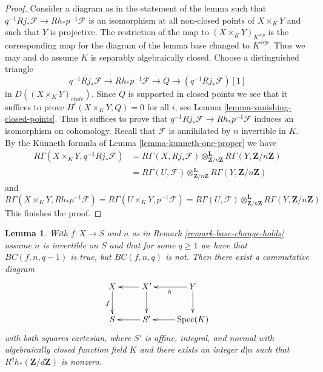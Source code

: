 \documentclass{amsart}
\theoremstyle{plain}
\newtheorem{lemma}[subsection]{Lemma}
\theoremstyle{definition}
\theoremstyle{remark}
\numberwithin{equation}{subsection}
\def\Spec{\mathop{\mathrm{Spec}}}
\def\etale{{\acute{e}tale}}
\begin{document}
\begin{proof}
\medskip\noindent
Consider a diagram as in the statement of the lemma
such that $q^{-1}Rj_*\mathcal{F} \to Rh_*p^{-1}\mathcal{F}$
is an isomorphism at all non-closed points of $X \times_K Y$
and such that $Y$ is projective.
The restriction of the map to $(X \times_K Y)_{K^{sep}}$
is the corresponding map for the diagram of the lemma
base changed to $K^{sep}$. Thus we may and do assume $K$
is separably algebraically closed. Choose a distinguished triangle
$$
q^{-1}Rj_*\mathcal{F} \to Rh_*p^{-1}\mathcal{F} \to Q \to
(q^{-1}Rj_*\mathcal{F})[1]
$$
in $D((X \times_K Y)_\etale)$. Since $Q$ is supported in
closed points we see that it suffices to prove
$H^i(X \times_K Y, Q) = 0$ for all $i$, see
Lemma \ref{lemma-vanishing-closed-points}.
Thus it suffices to prove that
$q^{-1}Rj_*\mathcal{F} \to Rh_*p^{-1}\mathcal{F}$
induces an isomorphism on cohomology. Recall that $\mathcal{F}$
is annihilated by $n$ invertible in $K$.
By the K\"unneth formula of Lemma \ref{lemma-kunneth-one-proper}
we have
\begin{align*}
R\Gamma(X \times_K Y, q^{-1}Rj_*\mathcal{F})
&=
R\Gamma(X, Rj_*\mathcal{F})
\otimes_{\mathbf{Z}/n\mathbf{Z}}^\mathbf{L}
R\Gamma(Y, \mathbf{Z}/n\mathbf{Z}) \\
& =
R\Gamma(U, \mathcal{F})
\otimes_{\mathbf{Z}/n\mathbf{Z}}^\mathbf{L}
R\Gamma(Y, \mathbf{Z}/n\mathbf{Z})
\end{align*}
and
$$
R\Gamma(X \times_K Y, Rh_*p^{-1}\mathcal{F}) =
R\Gamma(U \times_K Y, p^{-1}\mathcal{F}) =
R\Gamma(U, \mathcal{F})
\otimes_{\mathbf{Z}/n\mathbf{Z}}^\mathbf{L}
R\Gamma(Y, \mathbf{Z}/n\mathbf{Z})
$$
This finishes the proof.
\end{proof}


\begin{lemma}
\label{lemma-base-change-does-not-hold-post}
With $f : X \to S$ and $n$ as in Remark \ref{remark-base-change-holds}
assume $n$ is invertible on $S$ and that for some $q \geq 1$
we have that $BC(f, n, q - 1)$ is true, but $BC(f, n, q)$ is not.
Then there exist a commutative diagram
$$
\xymatrix{
X \ar[d]_f & X' \ar[d] \ar[l] & Y \ar[l]^h \ar[d] \\
S & S' \ar[l] & \Spec(K) \ar[l]
}
$$
with both squares cartesian, where $S'$ is affine, integral, and normal
with algebraically closed function field $K$ and there exists an integer
$d | n$ such that $R^qh_*(\mathbf{Z}/d\mathbf{Z})$ is nonzero.
\end{lemma}
\end{document}
